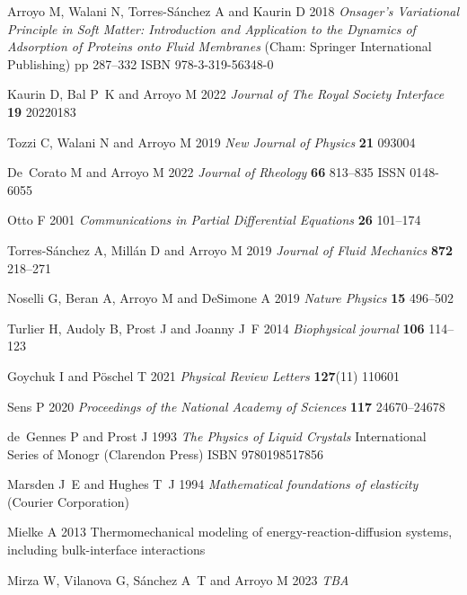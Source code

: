 \documentclass[12pt]{iopart}
\begin{document}
\begin{thebibliography}{100}
				Arroyo M, Walani N, Torres-S{\'a}nchez A and Kaurin D 2018 {\em Onsager's
				  Variational Principle in Soft Matter: Introduction and Application to the
				  Dynamics of Adsorption of Proteins onto Fluid Membranes\/} (Cham: Springer
				  International Publishing) pp 287--332 ISBN 978-3-319-56348-0
				
				Kaurin D, Bal P~K and Arroyo M 2022 {\em Journal of The Royal Society
				  Interface\/} {\bf 19} 20220183
				
				Tozzi C, Walani N and Arroyo M 2019 {\em New Journal of Physics\/} {\bf 21}
				  093004
				
				De~Corato M and Arroyo M 2022 {\em Journal of Rheology\/} {\bf 66} 813--835
				  ISSN 0148-6055
				
				Otto F 2001 {\em Communications in Partial Differential Equations\/} {\bf 26}
				  101--174
				
				Torres-S{\'a}nchez A, Mill{\'a}n D and Arroyo M 2019 {\em Journal of Fluid
				  Mechanics\/} {\bf 872} 218--271
				
				Noselli G, Beran A, Arroyo M and DeSimone A 2019 {\em Nature Physics\/} {\bf
				  15} 496--502
				
				Turlier H, Audoly B, Prost J and Joanny J~F 2014 {\em Biophysical journal\/}
				  {\bf 106} 114--123
				
				Goychuk I and P\"oschel T 2021 {\em Physical Review Letters\/} {\bf 127}(11) 110601
				
				Sens P 2020 {\em Proceedings of the National Academy of Sciences\/} {\bf 117}
				  24670--24678
				
				de~Gennes P and Prost J 1993 {\em The Physics of Liquid Crystals\/}
				  International Series of Monogr (Clarendon Press) ISBN 9780198517856
				
				Marsden J~E and Hughes T~J 1994 {\em Mathematical foundations of elasticity\/}
				  (Courier Corporation)
				
				Mielke A 2013 Thermomechanical modeling of energy-reaction-diffusion systems,
				  including bulk-interface interactions
				
				Mirza W, Vilanova G, S{\'a}nchez A~T and Arroyo M 2023 {\em TBA\/}
				

\end{thebibliography}
\end{document}
